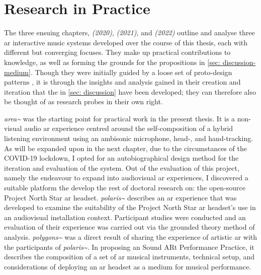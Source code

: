 \section{Research in Practice}
The three ensuing chapters, \textit{ (2020)}, \textit{ (2021)}, and \textit{ (2022)} outline and analyse three \gls{ar} interactive music systems developed over the course of this thesis, each with different but converging focuses. They make up practical contributions to knowledge, as well as forming the grounds for the propositions in \autoref{sec: discussion-medium}. Though they were initially guided by a loose set of proto-design patterns \citep{bilbow2020}, it is through the insights and analysis gained in their creation and iteration that the  in \autoref{sec: discussion} have been developed; they can therefore also be thought of as research probes in their own right.

\textit{area\textasciitilde{}} was the starting point for practical work in the present thesis. It is a non-visual audio \gls{ar} experience centred around the self-composition of a hybrid listening environment using an ambisonic microphone, head-, and hand-tracking. As will be expanded upon in the next chapter, due to the circumstances of the COVID-19 lockdown, I opted for an autobiographical design method for the iteration and evaluation of the system. Out of the evaluation of this project, namely the endeavour to expand into audiovisual \gls{ar} experiences, I discovered a suitable platform the develop the rest of doctoral research on: the open-source Project North Star \gls{ar} headset. \textit{polaris\textasciitilde{}} describes an \gls{ar} experience that was developed to examine the suitability of the Project North Star \gls{ar} headset's use in an audiovisual installation context. Participant studies were conducted and an evaluation of their experience was carried out via the grounded theory method of analysis. \textit{polygons\textasciitilde{}} was a direct result of sharing the experience of artistic \gls{ar} with the participants of \textit{polaris\textasciitilde{}}. In proposing an Sound ARt Performance Practice, it describes the composition of a set of \gls{ar} musical instruments, technical setup, and considerations of deploying an \gls{ar} headset as a medium for musical performance.


